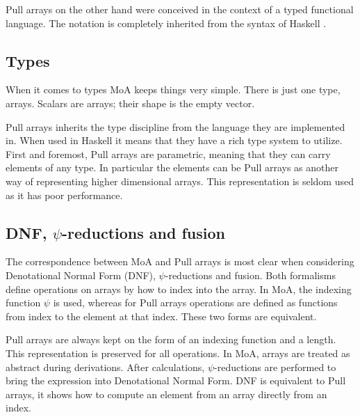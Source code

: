 \documentclass[preprint]{sigplanconf}
\begin{document}
Pull arrays on the other hand were conceived in the context of a
typed functional language. The notation is completely inherited from
the syntax of Haskell \cite{marlow2010haskell}.

\subsection{Types}
\label{sec:types}

When it comes to types MoA keeps things very simple. There is just one
type, arrays.  Scalars are arrays;  their shape is the empty vector. 


Pull arrays inherits the type discipline from the language they are
implemented in. When used in Haskell it means that they have a rich
type system to utilize. First and foremost, Pull arrays are
parametric, meaning that they can carry elements of any type. In
particular the elements can be Pull arrays as another way of
representing higher dimensional arrays. This representation is seldom
used as it has poor performance.

\subsection{DNF, \(\psi\)-reductions and fusion}
\label{sec:normalization}

The correspondence between MoA and Pull arrays is most clear when
considering Denotational Normal Form (DNF), \(\psi\)-reductions and
fusion. Both formalisms define operations on arrays by how to index
into the array. In MoA, the indexing function \(\psi\) is used,
whereas for Pull arrays operations are defined as functions from index
to the element at that index. These two forms are equivalent.

Pull arrays are always kept on the form of an indexing function and a
length. This representation is preserved for all operations. In MoA,
arrays are treated as abstract during derivations. After calculations,
\(\psi\)-reductions are performed to bring the expression into
Denotational Normal Form. DNF is equivalent to Pull arrays, it shows
how to compute an element from an array directly from an index.
\end{document}
